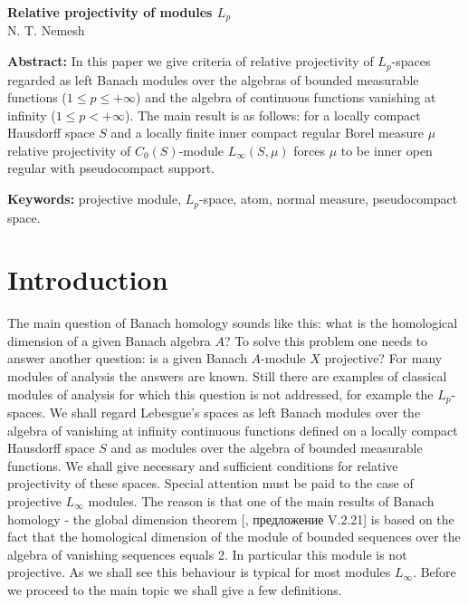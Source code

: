 \documentclass[12pt]{article}
\begin{document}
\begin{center}
    \Large \textbf{Relative projectivity of modules $L_p$}\\[0.5cm]
    \small {N. T. Nemesh}\\[0.5cm]
\end{center}

\thispagestyle{empty}

\medskip
\textbf{Abstract:} In this paper we give criteria of relative projectivity of $L_p$-spaces regarded as left Banach modules over the algebras of bounded measurable functions ($1\leq p\leq +\infty$) and the algebra of continuous functions vanishing at infinity ($1\leq p< +\infty$). The main result is as follows: for a locally compact Hausdorff space $S$ and a locally finite inner compact regular Borel measure $\mu$ relative projectivity of $C_0(S)$-module $L_\infty(S,\mu)$ forces $\mu$ to be inner open regular with pseudocompact support.
\medskip

\textbf{Keywords:} projective module, $L_p$-space, atom, normal measure, pseudocompact space.

\bigskip


\section{Introduction}
\label{SectionIntroduction}

The main question of Banach homology sounds like this: what is the homological dimension of a given Banach algebra $A$?
To solve this problem one needs to answer another question: is a given Banach $A$-module $X$ projective? For many modules of analysis the answers are known. Still there are examples of classical modules of analysis for which this question is not addressed, for example the $L_p$-spaces. We shall regard Lebesgue's spaces as left Banach modules over the algebra of vanishing at infinity continuous functions defined on a locally compact Hausdorff space $S$ and as modules over the algebra of bounded measurable functions. We shall give necessary and sufficient conditions for relative projectivity of these spaces. Special attention must be paid to the case of projective $L_\infty$ modules. The reason is that one of the main results of Banach homology - the global dimension theorem [\cite{HelHomolBanTopAlg}, предложение V.2.21] is based on the fact that the homological dimension of the module of bounded sequences over the algebra of vanishing sequences equals 2. In particular this module is not projective. As we shall see this behaviour is typical for most modules $L_\infty$. Before we proceed to the main topic we shall give a few definitions.
\end{document}
